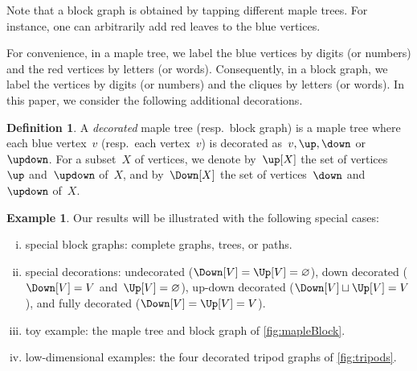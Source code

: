 \documentclass{amsart}
\theoremstyle{definition}
\newtheorem{definition}[theorem]{Definition}
\newtheorem{example}[theorem]{Example}
\newcommand{\darkblue}{\color{darkblue}} %
\newcommand{\defn}[1]{\textsl{\darkblue #1}} %
\newcommand{\vincent}[1]{\todo[color=blue!30]{#1 \\ \hfill --- V.}}
\newcommand{\vertexSet}{V}
\begin{document}
Note that a block graph is obtained by tapping different maple trees. For instance, one can arbitrarily add red leaves to the blue vertices.

For convenience, in a maple tree, we label the blue vertices by digits (or numbers) and the red vertices by letters (or words).
Consequently, in a block graph, we label the vertices by digits (or numbers) and the cliques by letters (or words).
In this paper, we consider the following additional decorations.

\begin{definition}
  A \defn{decorated} maple tree (resp.~block graph) is a maple tree where each blue vertex~$v$ (resp.~each vertex~$v$) is decorated as~$v, \up, \down$ or~$\updown$.
  For a subset~$X$ of vertices, we denote by~$\up[X]$ the set of vertices~$\up$ and~$\updown$ of~$X$, and by~$\Down[X]$ the set of vertices~$\down$ and~$\updown$ of~$X$.
  \vincent{fix}
\end{definition}

\begin{example}
  \label{exm:specialGraphs}
  Our results will be illustrated with the following special cases:
  \begin{enumerate}[(i)]
    \item special block graphs: complete graphs, trees, or paths.
    \item special decorations: undecorated ($\Down[\vertexSet] = \Up[\vertexSet] = \varnothing$), down decorated ($\Down[\vertexSet] = \vertexSet$ and~${\Up[\vertexSet] = \varnothing}$), up-down decorated ($\Down[\vertexSet] \sqcup \Up[\vertexSet] = \vertexSet$), and fully decorated ($\Down[\vertexSet] = \Up[\vertexSet] = \vertexSet$).
    \item toy example: the maple tree and block graph of \cref{fig:mapleBlock}.
    \item low-dimensional examples: the four decorated tripod graphs of \cref{fig:tripods}.
  \end{enumerate}
\end{example}
\end{document}
